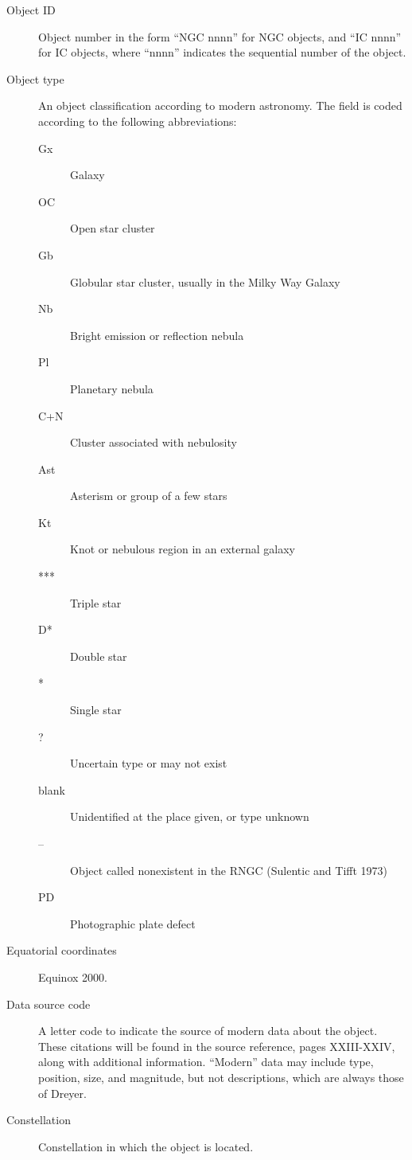 \begin{description}%

\item[Object ID] Object number in the form ``NGC nnnn'' for NGC objects, and
``IC nnnn'' for IC objects, where ``nnnn'' indicates the sequential number of
the object.

\item[Object type] An object classification according to modern astronomy. The
field is coded according to the following abbreviations:

\begin{description}%
\item[Gx] Galaxy
\item[OC] Open star cluster
\item[Gb] Globular star cluster, usually in the Milky Way Galaxy
\item[Nb] Bright emission or reflection nebula
\item[Pl] Planetary nebula
\item[C+N] Cluster associated with nebulosity
\item[Ast] Asterism or group of a few stars
\item[Kt] Knot or nebulous region in an external galaxy
\item[***] Triple star
\item[D*] Double star
\item[*] Single star
\item[?] Uncertain type or may not exist
\item[blank] Unidentified at the place given, or type unknown
\item[--] Object called nonexistent in the RNGC (Sulentic and Tifft 1973)
\item[PD] Photographic plate defect
\end{description}

\item[Equatorial coordinates] Equinox 2000.

\item[Data source code] A letter code to indicate the source of modern data
about the object. These citations will be found in the source reference, pages
XXIII-XXIV, along with additional information. ``Modern'' data may include type,
position, size, and magnitude, but not descriptions, which are always those of
Dreyer.

\item[Constellation] Constellation in which the object is located.


\end{description}
